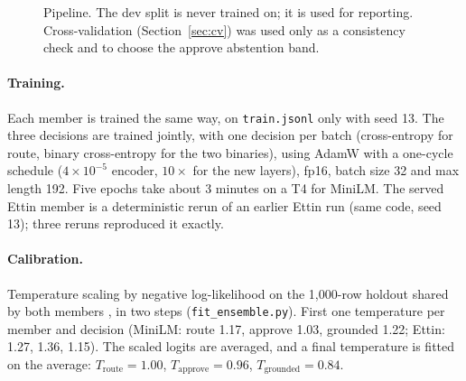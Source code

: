 \documentclass[11pt,a4paper]{article}
\begin{document}
\begin{figure}[h]
\centering
{}
\caption{Pipeline. The dev split is never trained on; it is used for reporting.
Cross-validation (Section~\ref{sec:cv}) was used only as a consistency check and
to choose the approve abstention band.}
\end{figure}

\paragraph{Training.} Each member is trained the same way, on \texttt{train.jsonl} only with seed 13. The three decisions are trained jointly, with one decision per batch
(cross-entropy for route, binary cross-entropy for the two binaries), using AdamW
with a one-cycle schedule ($4\times10^{-5}$ encoder, $10\times$ for the new
layers), fp16, batch size 32 and max length 192. Five epochs take about 3 minutes on a T4
for MiniLM. The served Ettin member is a deterministic rerun of an earlier Ettin
run (same code, seed 13); three reruns reproduced it exactly.

\paragraph{Calibration.} Temperature scaling by negative log-likelihood on the
1{,}000-row holdout shared by both members \cite{guo2017}, in two steps
(\texttt{fit\_ensemble.py}). First one temperature per member and decision
(MiniLM: route 1.17, approve 1.03, grounded 1.22; Ettin: 1.27, 1.36, 1.15).
The scaled logits are averaged, and a final temperature is fitted on the
average: $T_\text{route}=1.00$, $T_\text{approve}=0.96$, $T_\text{grounded}=0.84$.
\end{document}
